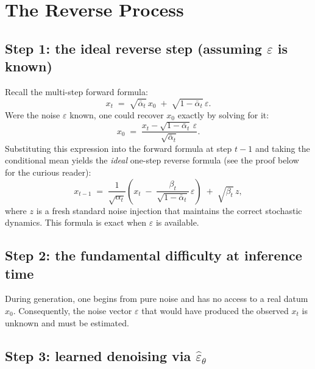 \documentclass[11pt]{article}
\begin{document}
\section{The Reverse Process}

\subsection*{Step 1: the ideal reverse step (assuming $\varepsilon$ is known)}

Recall the multi-step forward formula:
\[
  x_t \;=\; \sqrt{\bar{\alpha}_t}\,x_0 \;+\; \sqrt{1-\bar{\alpha}_t}\,\varepsilon.
\]
Were the noise $\varepsilon$ known, one could recover $x_0$ exactly by solving for it:
\[
  x_0 \;=\; \frac{x_t - \sqrt{1-\bar{\alpha}_t}\,\varepsilon}{\sqrt{\bar{\alpha}_t}}.
\]
Substituting this expression into the forward formula at step $t-1$ and taking the conditional mean yields the \emph{ideal} one-step reverse formula (see the proof below for the curious reader):
\[
  x_{t-1}
  \;=\;
  \frac{1}{\sqrt{\alpha_t}}
  \!\left(
    x_t \;-\; \frac{\beta_t}{\sqrt{1-\bar{\alpha}_t}}\,\varepsilon
  \right)
  \;+\; \sqrt{\beta_t}\,z,
\]
where $z$ is a fresh standard noise injection that maintains the correct stochastic dynamics.
This formula is exact when $\varepsilon$ is available.

\subsection*{Step 2: the fundamental difficulty at inference time}

During generation, one begins from pure noise and has no access to a real datum $x_0$.
Consequently, the noise vector $\varepsilon$ that would have produced the observed $x_t$ is unknown and must be estimated.

\subsection*{Step 3: learned denoising via $\widehat{\varepsilon}_\theta$}
\end{document}
